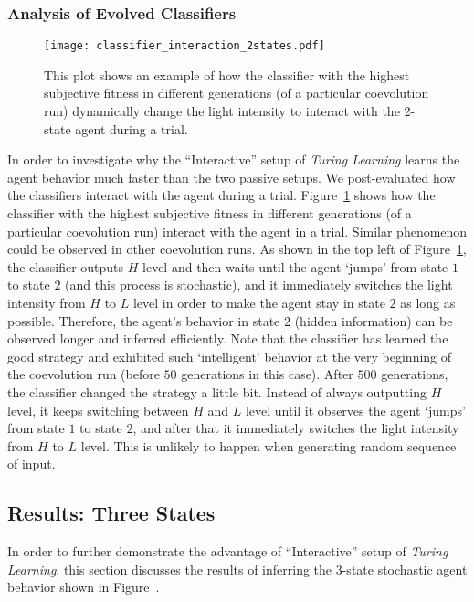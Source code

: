 \subsubsection{Analysis of Evolved Classifiers}
%
\begin{figure}[!t]
\centering
\texttt{[image: classifier\_interaction\_2states.pdf]}
\caption{This plot shows an example of how the classifier with the highest subjective fitness in different generations (of a particular coevolution run) dynamically change the light intensity to interact with the 2-state agent during a trial.}
\label{fig:classifier_interaction_2states}
\end{figure}
%
In order to investigate why the ``Interactive'' setup of \textit{Turing Learning} learns the agent behavior much faster than the two passive setups. We post-evaluated how the classifiers interact with the agent during a trial. Figure~\ref{fig:classifier_interaction_2states} shows how the classifier with the highest subjective fitness in different generations (of a particular coevolution run) interact with the agent in a trial. Similar phenomenon could be observed in other coevolution runs. 
As shown in the top left of Figure~\ref{fig:classifier_interaction_2states}, the classifier outputs $H$ level and then waits until the agent `jumps' from state $1$ to state $2$ (and this process is stochastic), and it immediately switches the light intensity from $H$ to $L$ level in order to make the agent stay in state $2$ as long as possible. Therefore, the agent's behavior in state $2$ (hidden information) can be observed longer and inferred efficiently. Note that the classifier has learned the good strategy and exhibited such `intelligent' behavior at the very beginning of the coevolution run (before $50$ generations in this case). After $500$ generations, the classifier changed the strategy a little bit. Instead of always outputting $H$ level, it keeps switching between $H$ and $L$ level until it observes the agent `jumps' from state $1$ to state $2$, and after that it immediately switches the light intensity from $H$ to $L$ level. This is unlikely to happen when generating random sequence of input.

\subsection{Results: Three States}\label{sec:results_interaction_stochastic_3states}

In order to further demonstrate the advantage of ``Interactive'' setup of \textit{Turing Learning}, this section discusses the results of inferring the 3-state stochastic agent behavior shown in Figure~. 

